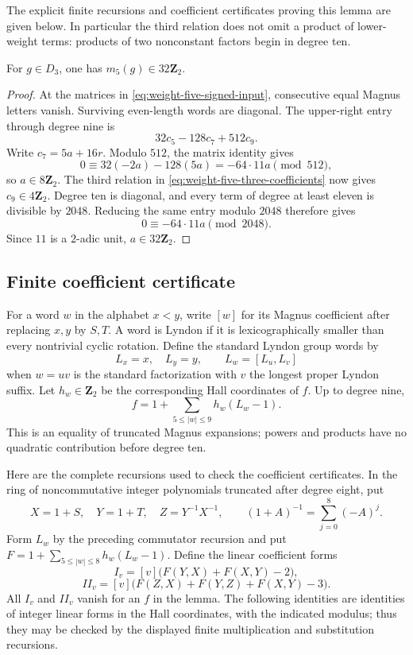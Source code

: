The explicit finite recursions and coefficient certificates proving
this lemma are given below.  In particular the third relation does
not omit a product of lower-weight terms: products of two
nonconstant factors begin in degree ten.

\begin{proposition}\label{prop:weight-five-upper-bound}
For $g\in D_3$, one has $m_5(g)\in32\mathbf Z_2$.
\end{proposition}

\begin{proof}
At the matrices in \eqref{eq:weight-five-signed-input}, consecutive
equal Magnus letters vanish.  Surviving even-length words are
diagonal.  The upper-right entry through degree nine is
\[
 32c_5-128c_7+512c_9.
\]
Write $c_7=5a+16r$.  Modulo $512$, the matrix identity gives
\[
 0\equiv32(-2a)-128(5a)=-64\cdot11a\pmod{512},
\]
so $a\in8\mathbf Z_2$.  The third relation in
\eqref{eq:weight-five-three-coefficients} now gives $c_9\in4\mathbf Z_2$.
Degree ten is diagonal, and every term of degree at least eleven
is divisible by $2048$.  Reducing the same entry modulo $2048$
therefore gives
\[
 0\equiv-64\cdot11a\pmod{2048}.
\]
Since $11$ is a $2$-adic unit, $a\in32\mathbf Z_2$.
\end{proof}

\subsection{Finite coefficient certificate}
\label{subsec:weight-five-certificate}

For a word $w$ in the alphabet $x<y$, write $[w]$ for its Magnus
coefficient after replacing $x,y$ by $S,T$.  A word is Lyndon if
it is lexicographically smaller than every nontrivial cyclic
rotation.  Define the standard Lyndon group words by
\[
 L_x=x,\quad L_y=y,\qquad L_w=[L_u,L_v]
\]
when $w=uv$ is the standard factorization with $v$ the longest
proper Lyndon suffix.  Let $h_w\in\mathbf Z_2$ be the corresponding
Hall coordinates of $f$.  Up to degree nine,
\begin{equation}\label{eq:weight-five-linear-collection}
 f=1+\sum_{5\le |w|\le9}h_w(L_w-1).
\end{equation}
This is an equality of truncated Magnus expansions; powers and
products have no quadratic contribution before degree ten.

Here are the complete recursions used to check the coefficient
certificates.  In the ring of noncommutative integer polynomials
truncated after degree eight, put
\[
 X=1+S,\quad Y=1+T,\quad Z=Y^{-1}X^{-1},\qquad
 (1+A)^{-1}=\sum_{j=0}^{8}(-A)^j.
\]
Form $L_w$ by the preceding commutator recursion and put
$F=1+\sum_{5\le|w|\le8}h_w(L_w-1)$.  Define the linear coefficient
forms
\[
 I_v=[v]\bigl(F(Y,X)+F(X,Y)-2\bigr),
\]
\[
 II_v=[v]\bigl(F(Z,X)+F(Y,Z)+F(X,Y)-3\bigr).
\]
All $I_v$ and $II_v$ vanish for an $f$ in the lemma.  The following
identities are identities of integer linear forms in the Hall
coordinates, with the indicated modulus; thus they may be checked
by the displayed finite multiplication and substitution recursions.


